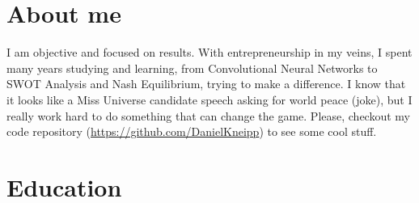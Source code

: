 \documentclass[a4paper]{cv-friggeri-x}
\begin{document}

\section{About me}
I am objective and focused on results. With entrepreneurship in my veins, I spent many years studying and learning, from Convolutional Neural Networks to SWOT Analysis and Nash Equilibrium, trying to make a difference. I know that it looks like a Miss Universe candidate speech asking for world peace (joke), but I really work hard to do something that can change the game. Please, checkout my code repository (\href{https://github.com/DanielKneipp}{https://github.com/DanielKneipp}) to see some cool stuff.


\section{Education}
\end{document}

